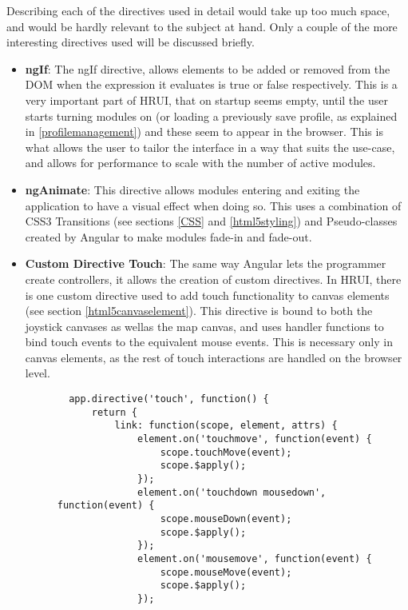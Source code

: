 Describing each of the directives used in detail would take up too much space, and would be hardly relevant to the subject at hand. Only a couple of the more interesting directives used will be discussed briefly.
\begin{itemize}
  \item \textbf{ngIf}: The ngIf directive, allows elements to be added or removed from the DOM when the expression it evaluates is true or false respectively. This is a very important part of HRUI, that on startup seems empty, until the user starts turning modules on (or loading a previously save profile, as explained in \ref{profilemanagement}) and these seem to appear in the browser. This is what allows the user to tailor the interface in a way that suits the use-case, and allows for performance to scale with the number of active modules.
  \item \textbf{ngAnimate}: This directive allows modules entering and exiting the application to have a visual effect when doing so. This uses a combination of CSS3 Transitions (see sections \ref{CSS} and \ref{html5styling}) and Pseudo-classes created by Angular to make modules fade-in and fade-out.
  \item \textbf{Custom Directive Touch}: The same way Angular lets the programmer create controllers, it allows the creation of custom directives. In HRUI, there is one custom directive used to add touch functionality to canvas elements (see section \ref{html5canvaselement}). This directive is bound to both the joystick canvases as wellas the map canvas, and uses handler functions to bind touch events to the equivalent mouse events. This is necessary only in canvas elements, as the rest of touch interactions are handled on the browser level.
  \begin{figure}[H]
  \centering
  \captionsetup{justification=centering}
  \begin{verbatim}
  app.directive('touch', function() {
      return {
          link: function(scope, element, attrs) {
              element.on('touchmove', function(event) {
                  scope.touchMove(event);
                  scope.$apply();
              });
              element.on('touchdown mousedown', function(event) {
                  scope.mouseDown(event);
                  scope.$apply();
              });
              element.on('mousemove', function(event) {
                  scope.mouseMove(event);
                  scope.$apply();
              });

\end{verbatim}
\end{figure}
\end{itemize}
